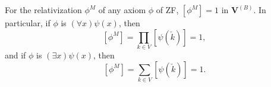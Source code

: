 For the relativization $\phi^M$ of any axiom $\phi$ of ZF, $[\phi^M] = 1$ in $\mathbf{V}^{(B)}$. In particular, if $\phi$ is $(\forall x)\psi(x)$, then
$$[\phi^M] = \prod_{k \in V} [\psi(\check{k})] = 1,$$
and if $\phi$ is $(\exists x)\psi(x)$, then
$$[\phi^M] = \sum_{k \in V} [\psi(\check{k})] = 1.$$
